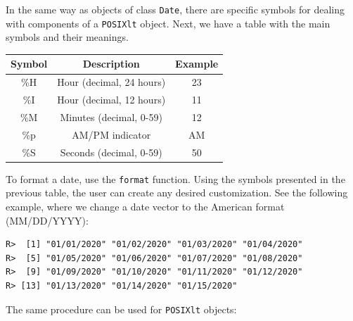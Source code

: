 \documentclass[
  12pt,
]{book}
\newenvironment{Shaded}{\begin{snugshade}}{\end{snugshade}}
\newcommand{\CommentTok}[1]{\textcolor[rgb]{0.37,0.37,0.37}{\textit{#1}}}
\newcommand{\DataTypeTok}[1]{\textcolor[rgb]{0.27,0.27,0.27}{#1}}
\newcommand{\DecValTok}[1]{\textcolor[rgb]{0.06,0.06,0.06}{#1}}
\newcommand{\KeywordTok}[1]{\textcolor[rgb]{0.27,0.27,0.27}{\textbf{#1}}}
\newcommand{\NormalTok}[1]{#1}
\newcommand{\OperatorTok}[1]{\textcolor[rgb]{0.43,0.43,0.43}{\textbf{#1}}}
\newcommand{\StringTok}[1]{\textcolor[rgb]{0.5,0.5,0.5}{#1}}
\begin{document}
In the same way as objects of class \texttt{Date}, there are specific symbols for dealing with components of a \texttt{POSIXlt} object. Next, we have a table with the main symbols and their meanings.

\begin{longtable}[]{@{}ccc@{}}
\toprule
Symbol & Description & Example\tabularnewline
\midrule
\endhead
\%H & Hour (decimal, 24 hours) & 23\tabularnewline
\%I & Hour (decimal, 12 hours) & 11\tabularnewline
\%M & Minutes (decimal, 0-59) & 12\tabularnewline
\%p & AM/PM indicator & AM\tabularnewline
\%S & Seconds (decimal, 0-59) & 50\tabularnewline
\bottomrule
\end{longtable}

To format a date, use the \texttt{format} function. Using the symbols presented in the previous table, the user can create any desired customization. See the following example, where we change a date vector to the American format (MM/DD/YYYY): 

\begin{Shaded}
\end{Shaded}

\begin{verbatim}
R>  [1] "01/01/2020" "01/02/2020" "01/03/2020" "01/04/2020"
R>  [5] "01/05/2020" "01/06/2020" "01/07/2020" "01/08/2020"
R>  [9] "01/09/2020" "01/10/2020" "01/11/2020" "01/12/2020"
R> [13] "01/13/2020" "01/14/2020" "01/15/2020"
\end{verbatim}

The same procedure can be used for \texttt{POSIXlt} objects:

\begin{Shaded}
\end{Shaded}
\end{document}
